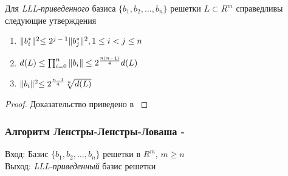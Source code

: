   \begin{theorem}
   Для \textit{LLL-приведенного} базиса {$\{ b_1, b_2, \dots, b_n \}$} решетки {$L \subset R^m$} справедливы следующие утверждения
   
   \begin{enumerate}
    \item \textit{{$ \lVert b_i^* \lVert^2 \le 2\textsuperscript{{$j-1$}} \lVert b_j^* \lVert^2, 1 \le i < j \le n  $}}
    \item \textit{{$ d(L) \le \prod_{i=0}^{n}{ \lVert b_i \lVert } \le 2\textsuperscript{{$\frac{n(n-1)}{4}$}} d(L) $}}
    \item \textit{{$ \lVert b_i \lVert^2 \le 2\textsuperscript{{$\frac{n-1}{4}$}} \sqrt[n]{d(L)} $}}
   \end{enumerate}

   \begin{proof}
      Доказательство приведено в \cite[Глава 8.2, страница 266]{mah06}
   \end{proof}

  \end{theorem}
  
  \subsubsection{Алгоритм Ленстры-Ленстры-Ловаша - \cite[Глава 8, страницы 256-273]{mah06}}
    Вход: Базис {$\{ b_1,b_2, \dots, b_n \}$} решетки в {$R^m$}, {$m \ge n$} \\
    Выход: \textit{LLL-приведенный} базис решетки
  
